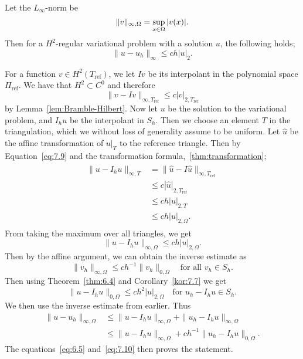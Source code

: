 \begin{thmx}{\quad}
    Let the $L_\infty$-norm be 
    \begin{equation*}
        \|v\|_{\infty, \Omega} = \sup_{x\in\Omega} |v(x)|.
    \end{equation*}
    Then 
    for a $H^2$-regular variational problem with a solution $u$, the following holds;
    \begin{equation}
        \|u-u_h\|_{\infty}\leq ch|u|_2.
    \end{equation}
\end{thmx}
\begin{bev}
    For a function $v\in H^2(T_{\text{ref}})$, we let $Iv$ be its interpolant in the polynomial space $\Pi_{\text{ref}}$.
    We have that $H^2\subset C^0$ and therefore 
    \begin{equation}
        \|v-Iv\|_{\infty,T_\text{ref}} \leq c|v|_{2,T_\text{ref}}
        \label{eq:7.9}
    \end{equation}
    by Lemma~\ref{lem:Bramble-Hilbert}.
    Now let $u$ be the solution to the variational problem, and $I_h u$ be the interpolant in $S_h$.
    Then we choose an element $T$ in the triangulation, which we without loss of generality assume to be uniform. 
    Let $\hat{u}$ be the affine transformation of $u|_T$ to the reference triangle.
    Then by Equation~\ref{eq:7.9} and the transformation formula,~\ref{thm:transformation};
    \begin{align}
        \begin{split}
            \|u-I_h u\|_{\infty,T} &= \|\hat{u} - I\hat{u}\|_{\infty,T_{\text{ref}}} \\
            &\leq c|\hat{u}|_{2,T_{\text{ref}}} \\
            &\leq ch|u|_{2,T} \\
            &\leq ch|u|_{2,\Omega}.
        \end{split}
        \label{eq:7.10}
    \end{align}
    From taking the maximum over all triangles, we get
    \begin{equation}
        \|u - I_h u \|_{\infty,\Omega} \leq ch|u|_{2,\Omega}.
    \end{equation}
    Then by the affine argument, we can obtain the inverse estimate as
    \begin{equation}
        \|v_h\|_{\infty,\Omega} \leq ch^{-1} \|v_h\|_{0,\Omega} \quad \text{for all } v_h\in S_h.
    \end{equation}
    Then using Theorem~\ref{thm:6.4} and Corollary~\ref{kor:7.7}
    we get
    \begin{equation}
        \|u-I_h u\|_{0,\Omega} \leq ch^2|u|_{2,\Omega}\quad \text{for } u_h-I_h u\in S_h.
    \end{equation}
    We then use the inverse estimate from earlier. Thus 
    \begin{align}
        \|u-u_h\|_{\infty,\Omega} &\leq \|u-I_h u\|_{\infty,\Omega} + \|u_h-I_h u\|_{\infty,\Omega} \\
        &\leq \|u-I_h u\|_{\infty,\Omega} + ch^{-1} \|u_h-I_h u\|_{0,\Omega}.
    \end{align}
    The equations~\eqref{eq:6.5} and~\eqref{eq:7.10} then proves the statement.
\end{bev}